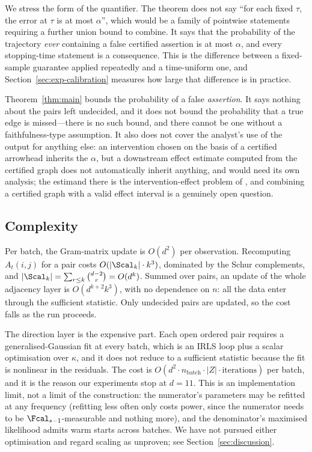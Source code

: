 We stress the form of the quantifier. The theorem does not say ``for each
fixed $\tau$, the error at $\tau$ is at most $\alpha$'', which would be a
family of pointwise statements requiring a further union bound to combine.
It says that the probability of the trajectory \emph{ever} containing a false
certified assertion is at most $\alpha$, and every stopping-time statement is
a consequence. This is the difference between a fixed-sample guarantee applied
repeatedly and a time-uniform one, and Section~\ref{sec:exp-calibration}
measures how large that difference is in practice.

\begin{remark}
Theorem~\ref{thm:main} bounds the probability of a false \emph{assertion}. It
says nothing about the pairs left undecided, and it does not bound the
probability that a true edge is missed---there is no such bound, and there
cannot be one without a faithfulness-type assumption. It also does not cover
the analyst's use of the output for anything else: an intervention chosen on
the basis of a certified arrowhead inherits the $\alpha$, but a downstream
effect estimate computed from the certified graph does not automatically
inherit anything, and would need its own analysis; the estimand there is the intervention-effect
problem of \citet{maathuis2009estimating}, and combining a certified graph
with a valid effect interval is a genuinely open question.
\end{remark}

\subsection{Complexity}\label{sec:complexity}

Per batch, the Gram-matrix update is $O(d^2)$ per observation. Recomputing
$A_t(i,j)$ for a pair costs $O(|\Scal_k| \cdot k^3)$, dominated by the Schur
complements, and $|\Scal_k| = \sum_{r \le k}\binom{d-2}{r} = O(d^k)$. Summed
over pairs, an update of the whole adjacency layer is $O(d^{k+2} k^3)$, with
no dependence on $n$: all the data enter through the sufficient statistic.
Only undecided pairs are updated, so the cost falls as the run proceeds.

The direction layer is the expensive part. Each open ordered pair requires a
generalised-Gaussian fit at every batch, which is an IRLS loop plus a scalar
optimisation over $\kappa$, and it does not reduce to a sufficient statistic
because the fit is nonlinear in the residuals. The cost is $O(d^2 \cdot
n_{\text{batch}} \cdot |Z| \cdot \text{iterations})$ per batch, and it is the
reason our experiments stop at $d = 11$. This is an implementation limit, not
a limit of the construction: the numerator's parameters may be refitted at any
frequency (refitting less often only costs power, since the numerator needs to
be $\Fcal_{s-1}$-measurable and nothing more), and the denominator's maximised
likelihood admits warm starts across batches. We have not pursued either
optimisation and regard scaling as unproven; see Section~\ref{sec:discussion}.

